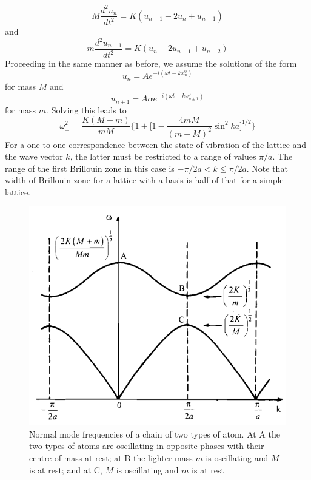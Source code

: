 \documentclass[%
 aip,
 amsmath,amssymb,
 reprint, floatfix%
]{revtex4-1}
\begin{document}
    \begin{equation}
        M \dfrac{d^2 u_n}{dt^2} = K(u_{n+1}-2u_n+u_{n-1})
    \end{equation}
    and
    \begin{equation}
        m \dfrac{d^2 u_{n-1}}{dt^2} = K(u_{n}-2u_{n-1}+u_{n-2})
    \end{equation}
    Proceeding in the same manner as before, we assume the solutions of the form
    \begin{equation}
        u_n = A e^{-i(\omega t-kx_n^0)}
    \end{equation}
    for mass $M$ and
    \begin{equation}
        u_{n\pm1} = A \alpha e^{-i(\omega t- kx_{n \pm 1}^0)}
    \end{equation}
    for mass $m$.
    Solving this leads to
    \begin{equation}
    \label{eq:branch}
        \omega_{\pm}^2 = \dfrac{K(M+m)}{mM}\Bigg \{ 1 \pm \Big[ 1 - \dfrac{4mM}{(m+M)^2} \sin^2 ka \Big]^{1/2} \Bigg \}
    \end{equation}
    For a one to one correspondence between the state of vibration of the lattice and the wave vector $k$, the latter must be restricted to a range of values $\pi/a$. The range of the first Brillouin zone in this case is $-\pi/2a < k \leq \pi/2a$. Note that width of Brillouin zone for a lattice with a basis is half of that for a simple lattice.
    \begin{figure}
        \centering
        \includegraphics[scale = 0.55]{Figures/normalmodeuneq.png}
        \caption{Normal mode frequencies of a chain of two types of atom. At A the two types of atoms are oscillating in opposite phases with their centre of mass at rest; at B the lighter mass $m$ is oscillating and $M$ is at rest; and at C, $M$ is oscillating and $m$ is at rest}
        \label{fig:my_label}
    \end{figure}
\end{document}

